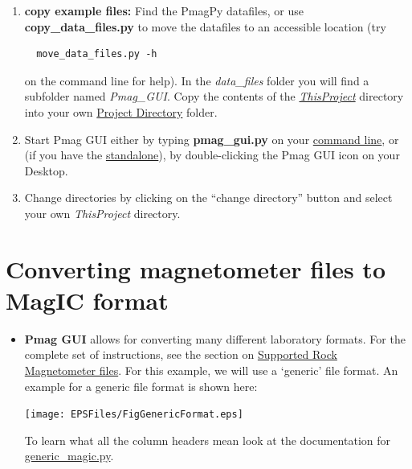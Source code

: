 \documentclass[11pt]{book}
\begin{document}
{\begin{enumerate}
\item \textbf{copy example files:}  Find the PmagPy datafiles, or use \textbf{copy\_data\_files.py} to move the  datafiles to an accessible location (try \begin{verbatim}
  move_data_files.py -h\end{verbatim} on the command line for help).  In the {\it data\_files } folder you will find a subfolder named {\it Pmag\_GUI}. Copy the contents of the  \href{#Project_Directory}{\it ThisProject} directory  into  your  own \href{#Project_Directory}{Project Directory} folder.
 \item Start Pmag GUI either by typing {\bf pmag\_gui.py} on your \href{#command_line}{command line}, or (if you have the \href{#standalone}{standalone}), by double-clicking the Pmag GUI icon on your Desktop.
 \item Change directories by clicking  on the ``change directory'' button and select your own {\it ThisProject} directory.
 \end{enumerate}


\section{Converting magnetometer files to MagIC format}
\begin{itemize}
\item {\bf Pmag GUI} allows for converting many different laboratory formats.  For the complete set of instructions, see the section on \href{#magnetometer_files}{Supported Rock Magnetometer files}.   For this example, we will use a `generic' file format.
An example for a generic file format is shown here:

\texttt{[image: EPSFiles/FigGenericFormat.eps]}

To learn what all the column headers mean look at the documentation for \href{#generic_magic.py}{generic\_magic.py}.

%


\end{itemize}}
\end{document}
